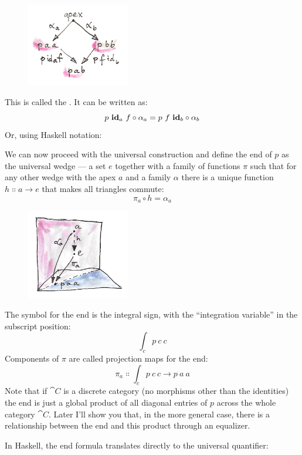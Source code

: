\begin{figure}[H]
\centering
\includegraphics[width=0.4\textwidth]{images/end-2.jpg}
\end{figure}

\noindent
This is called the . It can be written as:
\[p\ \idarrow[a]\ f \circ \alpha_a = p\ f\ \idarrow[b] \circ \alpha_b\]
Or, using Haskell notation:

We can now proceed with the universal construction and define the end of
$p$ as the universal wedge --- a set $e$ together with a
family of functions $\pi$ such that for any other wedge with the
apex $a$ and a family $\alpha$ there is a unique function
$h \Colon a \to e$ that makes all triangles commute:
\[\pi_a \circ h = \alpha_a\]

\begin{figure}[H]
\centering
\includegraphics[width=0.4\textwidth]{images/end-21.jpg}
\end{figure}

\noindent
The symbol for the end is the integral sign, with the ``integration
variable'' in the subscript position:
\[\int_c p\ c\ c\]
Components of $\pi$ are called projection maps for the end:
\[\pi_a \Colon \int_c p\ c\ c \to p\ a\ a\]
Note that if $\cat{C}$ is a discrete category (no morphisms other than
the identities) the end is just a global product of all diagonal entries
of $p$ across the whole category $\cat{C}$. Later I'll show you
that, in the more general case, there is a relationship between the end
and this product through an equalizer.

In Haskell, the end formula translates directly to the universal
quantifier:

